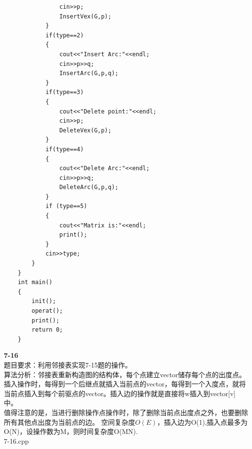 \documentclass[UTF8,a4paper]{article}
\begin{document}
\begin{lstlisting}
                cin>>p;
                InsertVex(G,p);
            }
            if(type==2)
            {
                cout<<"Insert Arc:"<<endl;
                cin>>p>>q;
                InsertArc(G,p,q);
            }
            if(type==3)
            {
                cout<<"Delete point:"<<endl;
                cin>>p;
                DeleteVex(G,p);
            }
            if(type==4)
            {
                cout<<"Delete Arc:"<<endl;
                cin>>p>>q;
                DeleteArc(G,p,q);
            }
            if (type==5)
            {
                cout<<"Matrix is:"<<endl;
                print();
            }
            cin>>type;
        }
    }
    int main()
    {
        init();
        operat();
        print();
        return 0;    
    }
\end{lstlisting}
\textbf{7-16}\\
题目要求：利用邻接表实现7-15题的操作。\\
算法分析：邻接表重新构造图的结构体，每个点建立vector储存每个点的出度点。\\
插入操作时，每得到一个后继点就插入当前点的vector，每得到一个入度点，就将当前点插入到每个前驱点的vector。插入边的操作就是直接将w插入到vector[v]中。\\
值得注意的是，当进行删除操作点操作时，除了删除当前点出度点之外，也要删除所有其他点出度为当前点的边。
空间复杂度$O(E)$，插入边为O(1),插入点最多为O(N)，设操作数为M，则时间复杂度O(MN).\\
7-16.cpp\\
\end{document}
